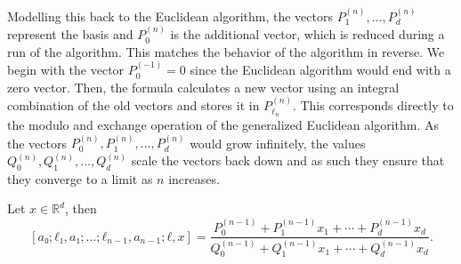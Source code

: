 Modelling this back to the Euclidean algorithm,
the vectors $P_1^{(n)}, …, P_d^{(n)}$ represent the basis and $P_0^{(n)}$ is
the additional vector, which is reduced during a run of the algorithm.
This matches the behavior of the algorithm in reverse.
We begin with the vector $P_0^{(-1)} = 0$ since the Euclidean algorithm
would end with a zero vector.
Then, the formula calculates a new vector using an integral combination of the
old vectors and stores it in $P_{ℓ_n}^{(n)}$.
This corresponds directly to the modulo and exchange operation of the
generalized Euclidean algorithm.
As the vectors $P_0^{(n)}, P_1^{(n)}, …, P_d^{(n)}$ would grow infinitely, the
values $Q_0^{(n)}, Q_1^{(n)}, …, Q_d^{(n)}$ scale the vectors back down and as
such they ensure that they converge to a limit as $n$ increases.

\begin{lemma}
  \label{lem:mdcf-wallis}
  Let $x ∈ ℝ^d$, then
  \[
    [a₀; ℓ₁, a₁; …; ℓ_{n-1}, a_{n-1}; ℓ, x]
    = \frac{P_0^{(n-1)} + P_1^{(n-1)} x_1 + ⋯ + P_d^{(n-1)} x_d}{Q_0^{(n-1)} + Q_1^{(n-1)} x_1 + ⋯ + Q_d^{(n-1)} x_d}.
  \]
\end{lemma}

